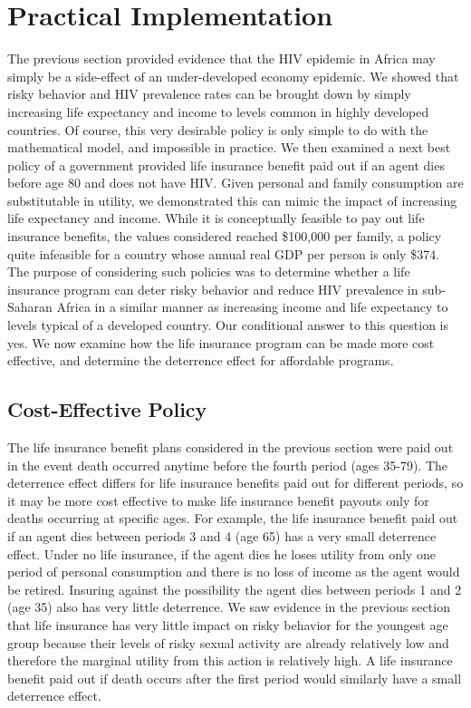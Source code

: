 \documentclass[12pt]{article}
\begin{document}
\section{Practical Implementation}
The previous section provided evidence that the HIV epidemic in Africa may simply be a side-effect of an under-developed economy epidemic.  We showed that risky behavior and HIV prevalence rates can be brought down by simply increasing life expectancy and income to levels common in highly developed countries.  Of course, this very desirable policy is only simple to do with the mathematical model, and impossible in practice.  We then examined a next best policy of a government provided life insurance benefit paid out if an agent dies before age 80 and does not have HIV.  Given personal and family consumption are substitutable in utility, we demonstrated this can mimic the impact of increasing life expectancy and income.  While it is conceptually feasible to pay out life insurance benefits, the values considered reached \$100,000 per family, a policy quite infeasible for a country whose annual real GDP per person is only \$374.  The purpose of considering such policies was to determine whether a life insurance program can deter risky behavior and reduce HIV prevalence in sub-Saharan Africa in a similar manner as increasing income and life expectancy to levels typical of a developed country.  Our conditional answer to this question is yes.  We now examine how the life insurance program can be made more cost effective, and determine the deterrence effect for affordable programs.

\subsection{Cost-Effective Policy}
The life insurance benefit plans considered in the previous section were paid out in the event death occurred anytime before the fourth period (ages 35-79).  The deterrence effect differs for life insurance benefits paid out for different periods, so it may be more cost effective to make life insurance benefit payouts only for deaths occurring at specific ages.  For example, the life insurance benefit paid out if an agent dies between periods 3 and 4 (age 65) has a very small deterrence effect.  Under no life insurance, if the agent dies he loses utility from only one period of personal consumption and there is no loss of income as the agent would be retired.  Insuring against the possibility the agent dies between periods 1 and 2 (age 35) also has very little deterrence.  We saw evidence in the previous section that life insurance has very little impact on risky behavior for the youngest age group because their levels of risky sexual activity are already relatively low and therefore the marginal utility from this action is relatively high.  A life insurance benefit paid out if death occurs after the first period would similarly have a small deterrence effect.
\end{document}
